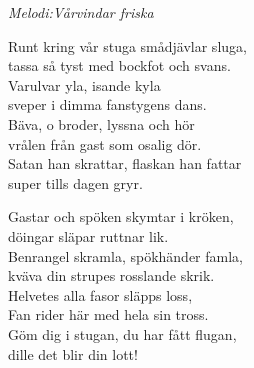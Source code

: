 {\footnotesize\textit{Melodi:Vårvindar friska}}\par
\vspace{10pt}
Runt kring vår stuga smådjävlar sluga,\\
tassa så tyst med bockfot och svans.\\
Varulvar yla, isande kyla\\
sveper i dimma fanstygens dans.\\
Bäva, o broder, lyssna och hör\\
vrålen från gast som osalig dör.\\
Satan han skrattar, flaskan han fattar\\
super tills dagen gryr.\par
\vspace{10pt}
Gastar och spöken skymtar i kröken,\\
döingar släpar ruttnar lik.\\
Benrangel skramla, spökhänder famla,\\
kväva din strupes rosslande skrik.\\
Helvetes alla fasor släpps loss,\\
Fan rider här med hela sin tross.\\
Göm dig i stugan, du har fått flugan,\\
dille det blir din lott!
